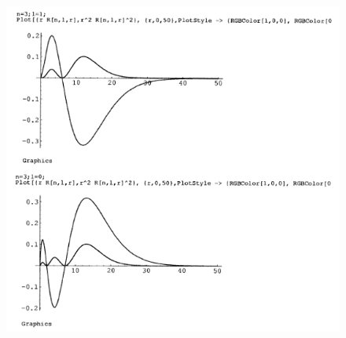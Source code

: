 \begin{figure}[!htbp]
\begin{center}
\includegraphics[width= \textwidth]{immagini/cap_21/fig_21_5.png}
\end{center}
\end{figure}